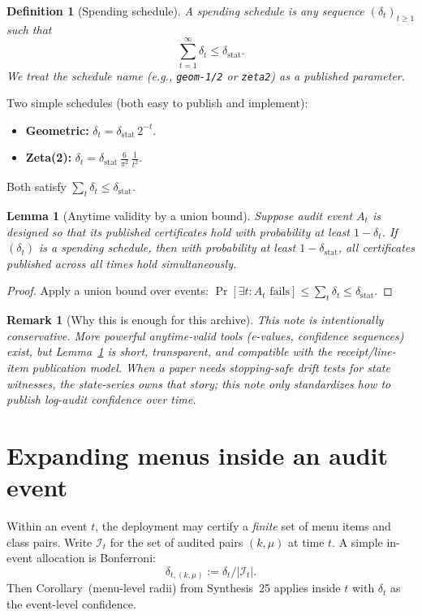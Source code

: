 \documentclass[11pt]{article}
\newtheorem{definition}{Definition}
\newtheorem{lemma}{Lemma}
\newtheorem{remark}{Remark}
\begin{document}
\begin{definition}[Spending schedule]
A \emph{spending schedule} is any sequence $(\delta_t)_{t\ge 1}$ such that
\[\sum_{t=1}^{\infty} \delta_t \le \delta_{\mathrm{stat}}.\]
We treat the schedule name (e.g., \texttt{geom-1/2} or \texttt{zeta2}) as a published parameter.
\end{definition}

Two simple schedules (both easy to publish and implement):
\begin{itemize}[leftmargin=*]
\item \textbf{Geometric:} $\delta_t = \delta_{\mathrm{stat}}\,2^{-t}$.
\item \textbf{Zeta(2):} $\delta_t = \delta_{\mathrm{stat}}\,\frac{6}{\pi^2}\,\frac{1}{t^2}$.
\end{itemize}
Both satisfy $\sum_t \delta_t \le \delta_{\mathrm{stat}}$.

\begin{lemma}[Anytime validity by a union bound]
\label{lem:anytime}
Suppose audit event $A_t$ is designed so that its published certificates hold with probability at least $1-\delta_t$.
If $(\delta_t)$ is a spending schedule, then with probability at least $1-\delta_{\mathrm{stat}}$, \emph{all} certificates published across \emph{all} times hold simultaneously.
\end{lemma}

\begin{proof}
Apply a union bound over events:
$\Pr[\exists t: A_t \text{ fails}]\le \sum_t \delta_t\le \delta_{\mathrm{stat}}$.
\end{proof}

\begin{remark}[Why this is enough for this archive]
This note is intentionally conservative.
More powerful anytime-valid tools (e-values, confidence sequences) exist, but Lemma~\ref{lem:anytime} is short, transparent, and compatible with the receipt/line-item publication model.
When a paper needs stopping-safe drift tests for \emph{state} witnesses, the state-series owns that story; this note only standardizes how to publish \emph{log-audit} confidence over time.\cite{series:state1A}
\end{remark}

\section{Expanding menus inside an audit event}
Within an event $t$, the deployment may certify a \emph{finite} set of menu items and class pairs.
Write $\mathcal I_t$ for the set of audited pairs $(k,\mu)$ at time $t$.
A simple in-event allocation is Bonferroni:
\[\delta_{t,(k,\mu)} := \delta_t / |\mathcal I_t|.\]
Then Corollary~(menu-level radii) from Synthesis~25 applies inside $t$ with $\delta_t$ as the event-level confidence.\cite{series:stataudit}
\end{document}
